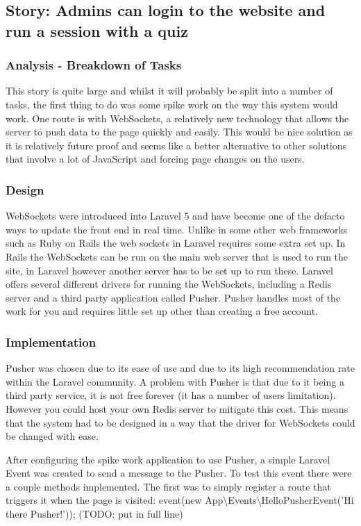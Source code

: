 \subsection{Story: Admins can login to the website and run a session with a quiz}
\subsubsection{Analysis - Breakdown of Tasks}
This story is quite large and whilst it will probably be split into a number of tasks, the first thing to do was some spike work on the way this system would work. One route is with WebSockets, a relatively new technology that allows the server to push data to the page quickly and easily. This would be nice solution as it is relatively future proof and seems like a better alternative to other solutions that involve a lot of JavaScript and forcing page changes on the users.
\subsubsection{Design}
WebSockets were introduced into Laravel 5 and have become one of the defacto ways to update the front end in real time. Unlike in some other web frameworks such as Ruby on Rails the web sockets in Laravel requires some extra set up. In Rails the WebSockets can be run on the main web server that is used to run the site\cite{rails-websockets}, in Laravel however another server has to be set up to run these. Laravel offers several different drivers for running the WebSockets, including a Redis server and a third party application called Pusher\cite{laravel-broadcasting}. Pusher handles most of the work for you and requires little set up other than creating a free account\cite{pusher-what-is}.
\subsubsection{Implementation}
Pusher was chosen due to its ease of use and due to its high recommendation rate within the Laravel community. A problem with Pusher is that due to it being a third party service, it is not free forever (it has a number of users limitation). However you could host your own Redis server to mitigate this cost. This means that the system had to be designed in a way that the driver for WebSockets could be changed with ease.

After configuring the spike work application to use Pusher, a simple Laravel Event was created to send a message to the Pusher. To test this event there were a couple methods implemented. The first was to simply register a route that triggers it when the page is visited: 
	event(new App\textbackslash Events\textbackslash HelloPusherEvent('Hi there Pusher!')); (TODO: put in full line)
 
